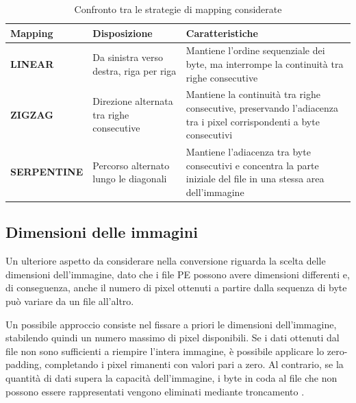 \begin{table}[H]
    \centering
    \small
    \caption{Confronto tra le strategie di mapping considerate}
    \label{tab:mapping_comparison}
    \renewcommand{\arraystretch}{1.3}
    \begin{tabularx}{\textwidth}{
        >{\raggedright\arraybackslash\bfseries}p{}
        >{\raggedright\arraybackslash}X
        >{\raggedright\arraybackslash}X
    }
        \toprule
        \textbf{Mapping} &
        \textbf{Disposizione} &
        \textbf{Caratteristiche} \\
        \midrule

        LINEAR &
        Da sinistra verso destra, riga per riga &
        Mantiene l'ordine sequenziale dei byte, ma interrompe la continuità
        tra righe consecutive \\

        \addlinespace
        ZIGZAG &
        Direzione alternata tra righe consecutive &
        Mantiene la continuità tra righe consecutive, preservando
        l'adiacenza tra i pixel corrispondenti a byte consecutivi \\

        \addlinespace
        SERPENTINE &
        Percorso alternato lungo le diagonali &
        Mantiene l'adiacenza tra byte consecutivi e concentra la parte
        iniziale del file in una stessa area dell'immagine \\

        \bottomrule
    \end{tabularx}
\end{table}

\subsection{Dimensioni delle immagini}

Un ulteriore aspetto da considerare nella conversione riguarda la
scelta delle dimensioni dell'immagine, dato che i file PE possono
avere dimensioni differenti e, di conseguenza, anche il numero di
pixel ottenuti a partire dalla sequenza di byte può variare da un
file all'altro.

Un possibile approccio consiste nel fissare a priori le dimensioni
dell'immagine, stabilendo quindi un numero massimo di pixel
disponibili. Se i dati ottenuti dal file non sono sufficienti a
riempire l'intera immagine, è possibile applicare lo zero-padding,
completando i pixel rimanenti con valori pari a zero. Al contrario,
se la quantità di dati supera la capacità dell'immagine, i byte in coda al file che
non possono essere rappresentati vengono eliminati mediante
troncamento \cite{nguyen2023}.

